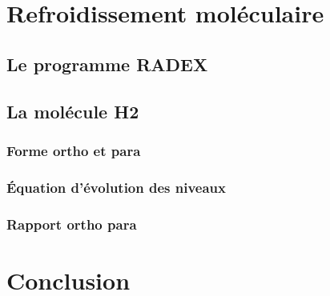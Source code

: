 \documentclass[10pt, a4paper]{report}
\numberwithin{equation}{subsection}
\begin{document}
\chapter{Refroidissement moléculaire}
\section{Le programme RADEX}
\section{La molécule H2}
\subsection{Forme ortho et para}
\subsection{\uppercase{é}quation d'évolution des niveaux}
\subsection{Rapport ortho para}

\chapter*{Conclusion}
\end{document}
